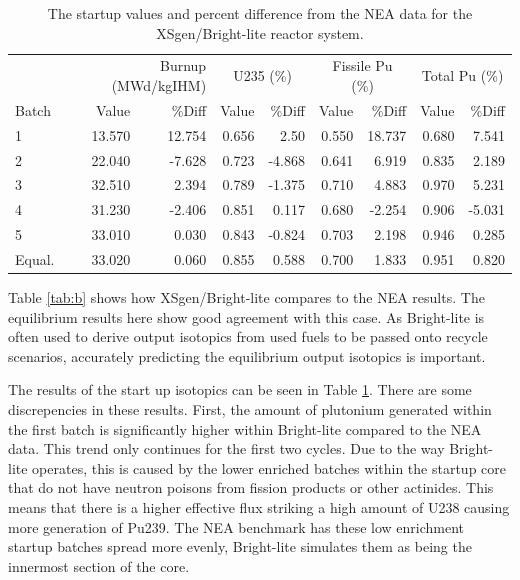 \documentclass{article}
\begin{document}
\begin{table}[!htb]
\centering
\caption{The startup values and percent difference from the NEA data for the XSgen/Bright-lite reactor system.}
\label{tab:c}
\begin{tabular}{lrrrrrrrr}
 & \multicolumn{2}{p{1cm}}{Burnup (MWd/kgIHM)} & \multicolumn{2}{c}{U235 (\%)} & \multicolumn{2}{c}{Fissile Pu (\%)} & \multicolumn{2}{c}{Total Pu (\%)} \\
Batch & Value & \%Diff & Value & \%Diff & Value & \%Diff & Value & \%Diff \\
1 & 13.570 & 12.754 & 0.656 & 2.50 & 0.550 & 18.737 & 0.680 & 7.541 \\
2 & 22.040 & -7.628 & 0.723 & -4.868 & 0.641 & 6.919 & 0.835 & 2.189 \\
3 & 32.510 & 2.394 & 0.789 & -1.375 & 0.710 & 4.883 & 0.970 & 5.231 \\
4 & 31.230 & -2.406 & 0.851 & 0.117 & 0.680 & -2.254 & 0.906 & -5.031 \\
5 & 33.010 & 0.030 & 0.843 & -0.824 & 0.703 & 2.198 & 0.946 & 0.285 \\
Equal. & 33.020 & 0.060 & 0.855 & 0.588 & 0.700 & 1.833 & 0.951 & 0.820
\end{tabular}
\end{table}

Table \ref{tab:b} shows how XSgen/Bright-lite compares to the NEA results. The equilibrium results here show good agreement with this case. As Bright-lite is often used to derive output isotopics from used fuels to be passed onto recycle scenarios, accurately predicting the equilibrium output isotopics is important.

The results of the start up isotopics can be seen in Table \ref{tab:c}. There are some discrepencies in these results. First, the amount of plutonium generated within the first batch is significantly higher within Bright-lite compared to the NEA data. This trend only continues for the first two cycles. Due to the way Bright-lite operates, this is caused by the lower enriched batches within the startup core that do not have neutron poisons from fission products or other actinides. This means that there is a higher effective flux striking a high amount of U238 causing more generation of Pu239. The NEA benchmark has these low enrichment startup batches spread more evenly, Bright-lite simulates them as being the innermost section of the core. 
\end{document}
